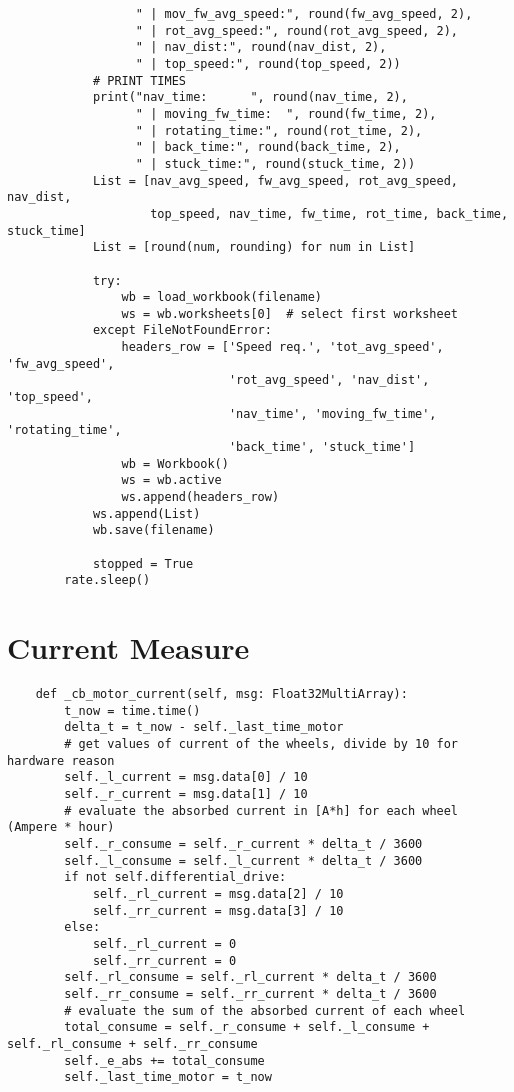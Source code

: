 \begin{verbatim}
                  " | mov_fw_avg_speed:", round(fw_avg_speed, 2),
                  " | rot_avg_speed:", round(rot_avg_speed, 2),
                  " | nav_dist:", round(nav_dist, 2),
                  " | top_speed:", round(top_speed, 2))
            # PRINT TIMES
            print("nav_time:      ", round(nav_time, 2),
                  " | moving_fw_time:  ", round(fw_time, 2),
                  " | rotating_time:", round(rot_time, 2),
                  " | back_time:", round(back_time, 2),
                  " | stuck_time:", round(stuck_time, 2))
            List = [nav_avg_speed, fw_avg_speed, rot_avg_speed, nav_dist,
                    top_speed, nav_time, fw_time, rot_time, back_time, stuck_time]
            List = [round(num, rounding) for num in List]

            try:
                wb = load_workbook(filename)
                ws = wb.worksheets[0]  # select first worksheet
            except FileNotFoundError:
                headers_row = ['Speed req.', 'tot_avg_speed', 'fw_avg_speed',
                               'rot_avg_speed', 'nav_dist', 'top_speed',
                               'nav_time', 'moving_fw_time', 'rotating_time', 
                               'back_time', 'stuck_time']
                wb = Workbook()
                ws = wb.active
                ws.append(headers_row)
            ws.append(List)
            wb.save(filename)

            stopped = True
        rate.sleep()

\end{verbatim}
\section{Current Measure}
\begin{verbatim}
    def _cb_motor_current(self, msg: Float32MultiArray):
        t_now = time.time()
        delta_t = t_now - self._last_time_motor
        # get values of current of the wheels, divide by 10 for hardware reason
        self._l_current = msg.data[0] / 10
        self._r_current = msg.data[1] / 10
        # evaluate the absorbed current in [A*h] for each wheel (Ampere * hour)
        self._r_consume = self._r_current * delta_t / 3600
        self._l_consume = self._l_current * delta_t / 3600
        if not self.differential_drive:
            self._rl_current = msg.data[2] / 10
            self._rr_current = msg.data[3] / 10
        else:
            self._rl_current = 0
            self._rr_current = 0
        self._rl_consume = self._rl_current * delta_t / 3600
        self._rr_consume = self._rr_current * delta_t / 3600
        # evaluate the sum of the absorbed current of each wheel
        total_consume = self._r_consume + self._l_consume + self._rl_consume + self._rr_consume
        self._e_abs += total_consume
        self._last_time_motor = t_now
\end{verbatim}

